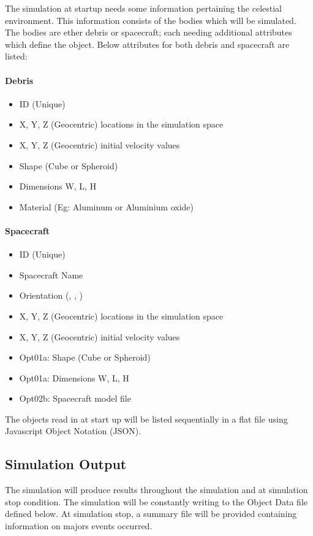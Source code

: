\documentclass{article}
\begin{document}
  The simulation at startup needs some information pertaining the celestial environment. This information consists of the bodies which will be simulated. The bodies are ether debris or spacecraft; each needing additional attributes which define the object. Below attributes for both debris and spacecraft are listed:
  
  \paragraph{Debris}
  \begin{itemize}
  	\item ID (Unique)
  	\item X, Y, Z (Geocentric) locations in the simulation space
  	\item X, Y, Z (Geocentric) initial velocity values
  	\item Shape (Cube or Spheroid)
  	\item Dimensions W, L, H
  	\item Material (Eg: Aluminum or Aluminium oxide)
  \end{itemize}
  
  \paragraph{Spacecraft}
  \begin{itemize}
    	\item ID (Unique)
    	\item Spacecraft Name
    	\item Orientation (\textalpha, \textbeta, \textgamma)
  	\item X, Y, Z (Geocentric) locations in the simulation space
  	\item X, Y, Z (Geocentric) initial velocity values
  	\item Opt01a: Shape (Cube or Spheroid)
  	\item Opt01a: Dimensions W, L, H
  	\item Opt02b: Spacecraft model file
  \end{itemize}
  
  The objects read in at start up will be listed sequentially in a flat file using Javascript Object Notation (JSON).
  
  \subsection{Simulation Output}
  
	The simulation will produce results throughout the simulation and at simulation stop condition. The simulation will be constantly writing to the Object Data file defined below. At simulation stop, a summary file will be provided containing information on majors events occurred. 
  
\end{document}
